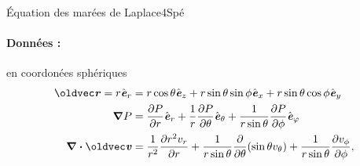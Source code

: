 \begin{exercise}{\'Equation des marées de Laplace}{4}{Spé}
\paragraph{Données :} en coordonées sphériques
\begin{align*}
    \vr = r\ve_r &= r\cos\theta\ve_z + r\sin\theta\sin\phi\ve_x + r\sin\theta\cos\phi\ve_y \\
    \grad P &= \pdv{P}{r}\ve_r + \dfrac{1}{r}\pdv{P}{\theta}\ve_\theta + \dfrac{1}{r\sin\theta}\pdv{P}{\phi}\ve_\varphi \\
    \div\vv &= \dfrac{1}{r^2}\pdv{r^2 v_r}{r} +  \dfrac{1}{r\sin\theta}\pdv{}{\theta}\qty(\sin\theta v_\theta) + \dfrac{1}{r\sin\theta} \pdv{v_\phi}{\phi},
\end{align*}

\end{exercise}